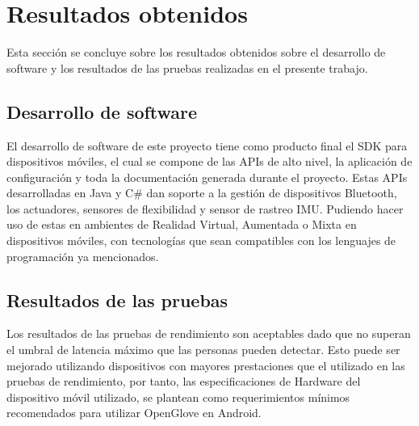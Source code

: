 \section{Resultados obtenidos}
Esta sección se concluye sobre los resultados obtenidos sobre el desarrollo de software y los resultados de las pruebas realizadas en el presente trabajo.

\subsection{Desarrollo de software}
El desarrollo de software de este proyecto tiene como producto final el SDK para dispositivos móviles, el cual se compone de las APIs de alto nivel, la aplicación de configuración y toda la documentación generada durante el proyecto. Estas APIs desarrolladas en Java y C\# dan soporte a la gestión de dispositivos Bluetooth, los actuadores, sensores de flexibilidad  y sensor de rastreo IMU. Pudiendo hacer uso de estas en ambientes de Realidad Virtual, Aumentada o Mixta en dispositivos móviles, con tecnologías que sean compatibles con los lenguajes de programación ya mencionados.

\subsection{Resultados de las pruebas}
	
	Los resultados de las pruebas de rendimiento son aceptables dado que no superan el umbral de latencia máximo que las personas pueden detectar. Esto puede ser mejorado utilizando dispositivos con mayores prestaciones que el utilizado en las pruebas de rendimiento, por tanto, las especificaciones de Hardware del dispositivo móvil utilizado, se plantean como requerimientos mínimos recomendados para utilizar OpenGlove en Android.
